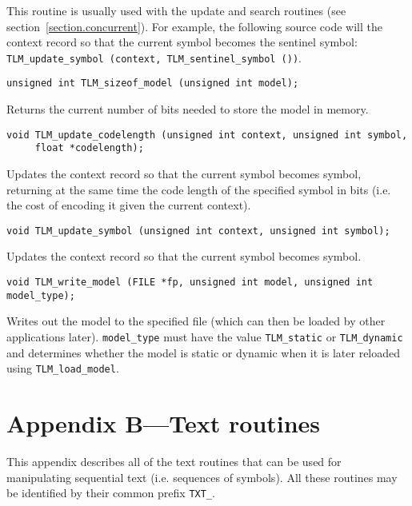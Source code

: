 \documentclass[11pt]{article}
\begin{document}
{This routine is usually used with the update and search routines (see section~\ref{section.concurrent}).
For example, the following source code will the
context record so that the current symbol becomes the sentinel symbol:
\verb|TLM_update_symbol (context, TLM_sentinel_symbol ())|.

\begin{verbatim}
unsigned int TLM_sizeof_model (unsigned int model);
\end{verbatim}

\vspace{-0.2cm}
Returns the current number of bits needed to store the
model in memory.

\begin{verbatim}
void TLM_update_codelength (unsigned int context, unsigned int symbol,
     float *codelength);
\end{verbatim}

\vspace{-0.2cm}
Updates the context record so that the current symbol becomes symbol,
returning at the same time the code length of the specified symbol in
bits (i.e. the cost of encoding it given the current context).

\begin{verbatim}
void TLM_update_symbol (unsigned int context, unsigned int symbol);
\end{verbatim}

\vspace{-0.2cm}
Updates the context record so that the current symbol becomes symbol.

\begin{verbatim}
void TLM_write_model (FILE *fp, unsigned int model, unsigned int model_type);
\end{verbatim}

\vspace{-0.2cm}
Writes out the model to the specified file (which can then be loaded
by other applications later). \verb|model_type| must have the value
\verb|TLM_static| or \verb|TLM_dynamic| and determines whether the
model is static or dynamic when it is later reloaded using
\verb|TLM_load_model|.


\section{Appendix B---Text routines}

This appendix describes all of the text routines that can be used
for manipulating sequential text (i.e. sequences of symbols). All these routines may be
identified by their common prefix \verb|TXT_|.

}
\end{document}
